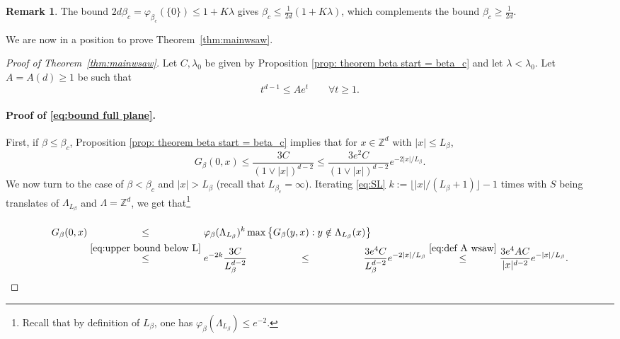 \documentclass[11pt,a4paper]{article}
\numberwithin{equation}{section}
\theoremstyle{plain}
\theoremstyle{definition}
\newtheorem{Rem}[Thm]{Remark}
\begin{document}
\begin{Rem}\label{rem: beta_c}
The bound $2d\beta_c=\varphi_{\beta_c}(\{0\})\le1+K\lambda$ gives $\beta_c\le \tfrac1{2d}(1+K\lambda)$, which complements the bound $\beta_c\geq\tfrac1{2d}$.
\end{Rem}
We are now in a position to prove Theorem~\ref{thm:mainwsaw}.
\begin{proof}[Proof of Theorem~\textup{\ref{thm:mainwsaw}}] Let $C,\lambda_0$ be given by Proposition \ref{prop: theorem beta start = beta_c} and let $\lambda<\lambda_0$. Let $A=A(d)\geq 1$ be such that 
\begin{equation}\label{eq:def A wsaw}
t^{d-1}\leq Ae^{t}\qquad   \forall t\geq 1.
\end{equation}
\paragraph{Proof of \eqref{eq:bound full plane}.}
First, if $\beta\leq \beta_c$,
Proposition \ref{prop: theorem beta start = beta_c} implies that for $x\in \mathbb Z^d$ with $|x|\le L_\beta$,
\begin{equation}\label{eq: proof nearcritical full space 0 wsaw}
	G_\beta(0,x)\leq \frac{3C}{(1\vee|x|)^{d-2}}\leq \frac{3e^2C}{(1\vee|x|)^{d-2}}e^{-2|x|/L_\beta}.
\end{equation}
We now turn to the case of $\beta<\beta_c$ and $|x|>L_\beta$ (recall that $L_{\beta_c}=\infty$). Iterating \eqref{eq:SL} $k:=\lfloor |x|/(L_\beta+1)\rfloor-1$ times with $S$ being translates of $\Lambda_{L_\beta}$ and $\Lambda=\mathbb Z^d$, we get that\footnote{Recall that by definition of $L_\beta$, one has $\varphi_\beta(\Lambda_{L_\beta})\leq e^{-2}$.} 
\begin{align}\label{eq:iterate}
G_\beta(0,x)&\stackrel{\phantom{\eqref{eq:upper bound below L}}}\le \varphi_\beta(\Lambda_{L_\beta})^k \max\big\{G_\beta(y,x):y\notin\Lambda_{L_\beta}(x)\big\}\\&\stackrel{\eqref{eq:upper bound below L}}\leq e^{-2k}\frac{3C}{L_\beta^{d-2}}\stackrel{\phantom{\eqref{eq:upper bound below L}}}\leq \frac{3e^4C}{L_\beta^{d-2}}e^{-2|x|/L_\beta}
\stackrel{\eqref{eq:def A wsaw}}\leq \frac{3e^4AC}{|x|^{d-2}}e^{-|x|/L_\beta}.\label{eq: proof nearcritical full space wsaw}
\end{align}

\end{proof}
\end{document}
